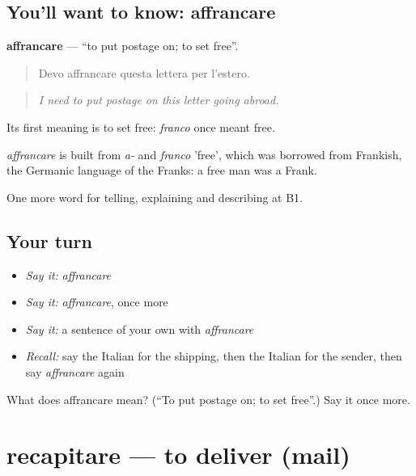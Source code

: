 \subsection*{You'll want to know: affrancare}
\textbf{affrancare} — \textquotedblleft{}to put postage on; to set free\textquotedblright{}.

\begin{quote}
Devo affrancare questa lettera per l'estero.
\end{quote}

\begin{quote}
\emph{I need to put postage on this letter going abroad.}
\end{quote}

Its first meaning is to set free: \emph{franco} once meant free.

\begin{cousinweb}
\emph{affrancare} is built from \emph{a-} and \emph{franco} 'free', which was borrowed from Frankish, the Germanic language of the Franks: a free man was a Frank.
\end{cousinweb}

\begin{grammarlens}[title={What you've built}]
One more word for telling, explaining and describing at B1.
\end{grammarlens}

\subsection*{Your turn}
\begin{itemize}
\raggedright
  \item \emph{Say it:} \emph{affrancare}
  \item \emph{Say it:} \emph{affrancare}, once more
  \item \emph{Say it:} a sentence of your own with \emph{affrancare}
  \item \emph{Recall:} say the Italian for the shipping, then the Italian for the sender, then say \emph{affrancare} again
\end{itemize}

\begin{tcolorbox}[breakable,colback=teal!4,colframe=teal!35!black,title={Before you move on}]
What does affrancare mean? (\textquotedblleft{}To put postage on; to set free\textquotedblright{}.) Say it once more.
\end{tcolorbox}
\section[recapitare]{recapitare — to deliver (mail)}

